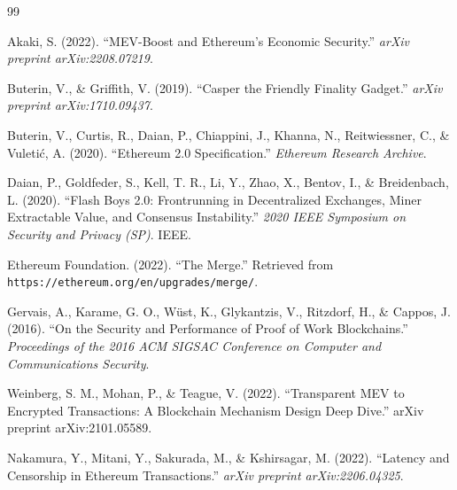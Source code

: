\documentclass[12pt]{article}
\begin{document}
\begin{thebibliography}{99}

Akaki, S. (2022). ``MEV-Boost and Ethereum's Economic Security.'' \textit{arXiv preprint arXiv:2208.07219}.

Buterin, V., \& Griffith, V. (2019). ``Casper the Friendly Finality Gadget.'' \textit{arXiv preprint arXiv:1710.09437}.

Buterin, V., Curtis, R., Daian, P., Chiappini, J., Khanna, N., Reitwiessner, C., \& Vuletić, A. (2020). ``Ethereum 2.0 Specification.'' \textit{Ethereum Research Archive}.

Daian, P., Goldfeder, S., Kell, T. R., Li, Y., Zhao, X., Bentov, I., \& Breidenbach, L. (2020). ``Flash Boys 2.0: Frontrunning in Decentralized Exchanges, Miner Extractable Value, and Consensus Instability.'' \textit{2020 IEEE Symposium on Security and Privacy (SP)}. IEEE.

Ethereum Foundation. (2022). ``The Merge.'' Retrieved from \texttt{https://ethereum.org/en/upgrades/merge/}.

Gervais, A., Karame, G. O., Wüst, K., Glykantzis, V., Ritzdorf, H., \& Cappos, J. (2016). ``On the Security and Performance of Proof of Work Blockchains.'' \textit{Proceedings of the 2016 ACM SIGSAC Conference on Computer and Communications Security}.

Weinberg, S. M., Mohan, P., \& Teague, V. (2022). ``Transparent MEV to Encrypted Transactions: A Blockchain Mechanism Design Deep Dive.'' arXiv preprint arXiv:2101.05589.

Nakamura, Y., Mitani, Y., Sakurada, M., \& Kshirsagar, M. (2022). ``Latency and Censorship in Ethereum Transactions.'' \textit{arXiv preprint arXiv:2206.04325}.

\end{thebibliography}
\end{document}
